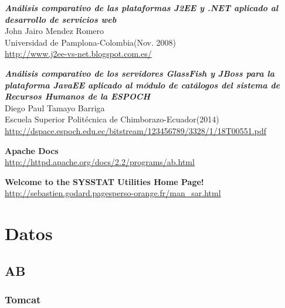 \documentclass[a4paper, 10pt]{article}
\begin{document}
\begin{thebibliography}{10}
	\textbf{\textit{Análisis comparativo de las plataformas J2EE y .NET aplicado
	al desarrollo de servicios web}}\\
	John Jairo Mendez Romero\\
	Universidad de Pamplona-Colombia(Nov. 2008)\\
		\url{http://www.j2ee-vs-net.blogspot.com.es/}
	
	\textbf{\textit{Análisis comparativo de los servidores GlassFish y JBoss para
	la plataforma JavaEE aplicado al módulo de catálogos del sistema de Recursos
	Humanos de la ESPOCH}}\\
	Diego Paul Tamayo Barriga\\
	Escuela Superior Politécnica de Chimborazo-Ecuador(2014)\\
		\url{http://dspace.espoch.edu.ec/bitstream/123456789/3328/1/18T00551.pdf}

	\textbf{Apache Docs}\\
		\url{http://httpd.apache.org/docs/2.2/programs/ab.html}
	
	
	\textbf{Welcome to the SYSSTAT Utilities Home Page!}\\
		\url{http://sebastien.godard.pagesperso-orange.fr/man_sar.html}
\end{thebibliography}

\appendix
\section{Datos}
	\label{sec: Datos}
	\subsection{AB}
		\subsubsection{Tomcat}
			
			
			
			
			
			
			
			
			
			
			
			
			
			
			
			
			
			
			
			
			
			
			
			
			
			
			
		
\end{document}
